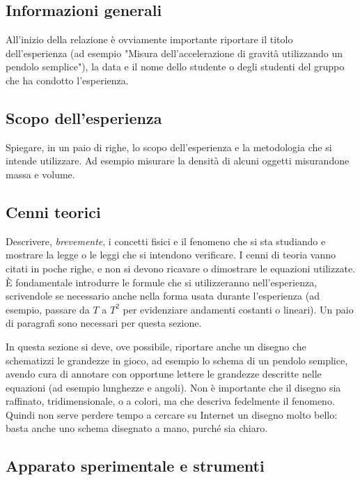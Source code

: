 \subsection{Informazioni generali}

All'inizio della relazione è ovviamente importante riportare il titolo
dell'esperienza (ad esempio "Misura dell'accelerazione di gravità
utilizzando un pendolo semplice"), la data e il nome dello studente o degli
studenti del gruppo che ha condotto l'esperienza.


\subsection{Scopo dell'esperienza}

Spiegare, in un paio di righe, lo scopo dell'esperienza e la metodologia che
si intende utilizzare. Ad esempio misurare la densità di alcuni oggetti
misurandone massa e volume.


\subsection{Cenni teorici}

Descrivere, \emph{brevemente}, i concetti fisici e il fenomeno che si sta
studiando e mostrare la legge o le leggi che si intendono verificare. I cenni
di teoria vanno citati in poche righe, e non si devono ricavare o dimostrare
le equazioni utilizzate. \`E fondamentale introdurre le formule che si
utilizzeranno nell'esperienza, scrivendole se necessario anche nella forma
usata durante l'esperienza (ad esempio, passare da $T$ a $T^{2}$ per evidenziare
andamenti costanti o lineari). Un paio di paragrafi sono necessari per questa
sezione.

In questa sezione si deve, ove possibile, riportare anche un disegno che
schematizzi le grandezze in gioco, ad esempio lo schema di un pendolo semplice,
avendo cura di annotare con opportune lettere le grandezze descritte nelle
equazioni (ad esempio lunghezze e angoli). Non è importante che il disegno
sia raffinato, tridimensionale, o a colori, ma che descriva fedelmente il
fenomeno. Quindi non serve perdere tempo a cercare su Internet un disegno molto
bello: basta anche uno schema disegnato a mano, purché sia chiaro.


\subsection{Apparato sperimentale e strumenti}

